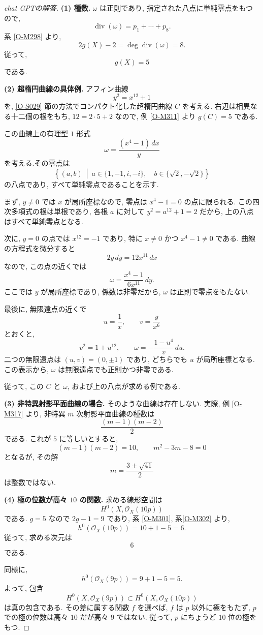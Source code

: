 \documentclass[dvipdfmx,a4paper,11pt]{article} %
\theoremstyle{definition}
\numberwithin{equation}{section}
\begin{document}
\begin{proof}[chat GPTの解答]
\medskip
\noindent
\textbf{(1) 種数.}
$\omega$ は正則であり, 指定された八点に単純零点をもつので, 
\[
\operatorname{div}(\omega)=p_1+\cdots+p_8.
\]
系 \ref{O-M298} より, 
\[
2g(X)-2=\deg\operatorname{div}(\omega)=8.
\]
従って, 
\[
\boxed{g(X)=5}
\]
である.

\medskip
\noindent
\textbf{(2) 超楕円曲線の具体例.}
アフィン曲線
\[
y^2=x^{12}+1
\]
を, \ref{O-S029} 節の方法でコンパクト化した超楕円曲線 $C$ を考える.
右辺は相異なる十二個の根をもち, 
$12=2\cdot5+2$ なので, 例 \ref{O-M311} より $g(C)=5$ である.

この曲線上の有理型 $1$ 形式
\[
\omega=\frac{(x^4-1)\,dx}{y}
\]
を考える.その零点は
\[
\left\{(a,b)\ \middle|\
a\in\{1,-1,i,-i\},\quad b\in\{\sqrt2,-\sqrt2\}
\right\}
\]
の八点であり, すべて単純零点であることを示す.

まず, $y\neq0$ では $x$ が局所座標なので, 
零点は $x^4-1=0$ の点に限られる.
この四次多項式の根は単根であり, 
各根 $a$ に対して $y^2=a^{12}+1=2$ だから, 
上の八点はすべて単純零点となる.

次に, $y=0$ の点では $x^{12}=-1$ であり, 
特に $x\neq0$ かつ $x^4-1\neq0$ である.
曲線の方程式を微分すると
\[
2y\,dy=12x^{11}\,dx
\]
なので, この点の近くでは
\[
\omega=\frac{x^4-1}{6x^{11}}\,dy.
\]
ここでは $y$ が局所座標であり, 係数は非零だから, 
$\omega$ は正則で零点をもたない.

最後に, 無限遠点の近くで
\[
u=\frac1x,\qquad v=\frac{y}{x^6}
\]
とおくと, 
\[
v^2=1+u^{12},\qquad
\omega=-\frac{1-u^4}{v}\,du.
\]
二つの無限遠点は $(u,v)=(0,\pm1)$ であり, 
どちらでも $u$ が局所座標となる.
この表示から, $\omega$ は無限遠点でも正則かつ非零である.

従って, この $C$ と $\omega$, および上の八点が求める例である.

\medskip
\noindent
\textbf{(3) 非特異射影平面曲線の場合.}
そのような曲線は存在しない.
実際, 例 \ref{O-M317} より, 
非特異 $m$ 次射影平面曲線の種数は
\[
\frac{(m-1)(m-2)}2
\]
である.
これが $5$ に等しいとすると, 
\[
(m-1)(m-2)=10,
\qquad
m^2-3m-8=0
\]
となるが, その解
\[
m=\frac{3\pm\sqrt{41}}2
\]
は整数ではない.

\medskip
\noindent
\textbf{(4) 極の位数が高々 $10$ の関数.}
求める線形空間は
\[
H^0(X,\mathcal O_X(10p))
\]
である.
$g=5$ なので $2g-1=9$ であり, 
系 \ref{O-M301}, 系\ref{O-M302} より, 
\[
h^0(\mathcal O_X(10p))=10+1-5=6.
\]
従って, 求める次元は
\[
\boxed{6}
\]
である.

同様に, 
\[
h^0(\mathcal O_X(9p))=9+1-5=5.
\]
よって, 包含
\[
H^0(X,\mathcal O_X(9p))
\subset H^0(X,\mathcal O_X(10p))
\]
は真の包含である.
その差に属する関数 $f$ を選べば, 
$f$ は $p$ 以外に極をもたず, 
$p$ での極の位数は高々 $10$ だが高々 $9$ ではない.
従って, $p$ にちょうど $10$ 位の極をもつ.


\end{proof}
\end{document}
